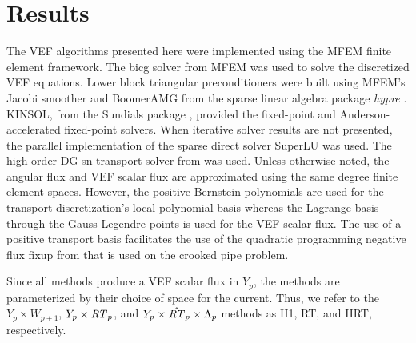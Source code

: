\documentclass[../doc.tex]{subfiles}
\begin{document}
\section{Results}
The VEF algorithms presented here were implemented using the MFEM \cite{mfem-paper,mfem-web} finite element framework. The \gls{bicg} solver from MFEM was used to solve the discretized VEF equations. Lower block triangular preconditioners were built using MFEM's Jacobi smoother and BoomerAMG from the sparse linear algebra package \emph{hypre} \cite{hypre}. KINSOL, from the Sundials package \cite{hindmarsh2005sundials}, provided the fixed-point and Anderson-accelerated fixed-point solvers. When iterative solver results are not presented, the parallel implementation of the sparse direct solver SuperLU \cite{lidemmel03} was used. 
The high-order DG \gls{sn} transport solver from \cite{graph_sweeps} was used. 
Unless otherwise noted, the angular flux and VEF scalar flux are approximated using the same degree finite element spaces. However, the positive Bernstein polynomials \cite{doi:10.1137/11082539X} are used for the transport discretization's local polynomial basis whereas the Lagrange basis through the Gauss-Legendre points is used for the VEF scalar flux. The use of a positive transport basis facilitates the use of the quadratic programming negative flux fixup from \cite{YEE2020109696} that is used on the crooked pipe problem. 

Since all methods produce a VEF scalar flux in $Y_p$, the methods are parameterized by their choice of space for the current. Thus, we refer to the $Y_p \times W_{p+1}$, $Y_p \times \mathit{RT}_p$, and $Y_p \times \hat{\mathit{RT}}_p \times \Lambda_p$ methods as H1, RT, and HRT, respectively. 
\end{document}
